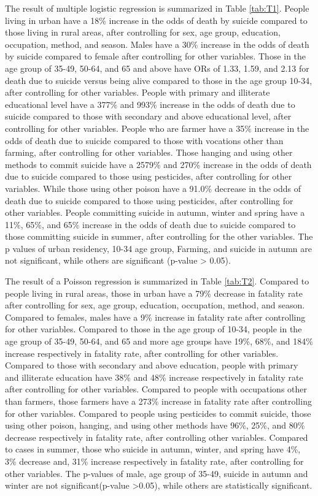 \documentclass[a4paper]{article}
\begin{document}
The result of multiple logistic regression is summarized in Table \ref{tab:T1}. People living in urban have a 18\% increase in the odds of death by suicide compared to those living in rural areas, after controlling for sex, age group, education, occupation, method, and season. Males have a 30\% increase in the odds of death by suicide compared to female after controlling for other variables. Those in the age group of 35-49, 50-64, and 65 and above have ORs of 1.33, 1.59, and 2.13 for death due to suicide versus being alive compared to those in the age group 10-34, after controlling for other variables. People with primary and illiterate educational level have a 377\% and 993\% increase in the odds of death due to suicide compared to those with secondary and above educational level, after controlling for other variables. People who are farmer have a 35\% increase in the odds of death due to suicide compared to those with vocations other than farming, after controlling for other variables. Those hanging and using other methods to commit suicide have a 2579\% and 270\% increase in the odds of death due to suicide compared to those using pesticides, after controlling for other variables. While those using other poison have a 91.0\% decrease in the odds of death due to suicide compared to those using pesticides, after controlling for other variables. People committing suicide in autumn, winter and spring have a 11\%, 65\%, and 65\% increase in the odds of death due to suicide compared to those committing suicide in summer, after controlling for the other variables. The p values of urban residency, 10-34 age group, Farming, and suicide in autumn are not significant, while others are significant (p-value > 0.05).
\newline

\newline
The result of a Poisson regression is summarized in Table \ref{tab:T2}. Compared to people living in rural areas, those in urban have a 79\% decrease in fatality rate after controlling for sex, age group, education, occupation, method, and season. Compared to females, males have a 9\% increase in fatality rate after controlling for other variables. Compared to those in the age group of 10-34, people in the age group of 35-49, 50-64, and 65 and more age groups have 19\%, 68\%, and 184\% increase respectively in fatality rate, after controlling for other variables. Compared to those with secondary and above education, people with primary and illiterate education have 38\% and 48\% increase respectively in fatality rate after controlling for other variables. Compared to people with occupations other than farmers, those farmers have a 273\% increase in fatality rate after controlling for other variables. Compared to people using pesticides to commit suicide, those using other poison, hanging, and using other methods have 96\%, 25\%, and 80\% decrease respectively in fatality rate, after controlling other variables. Compared to cases in summer, those who suicide in autumn, winter, and spring have 4\%,  3\% decrease and, 31\% increase respectively in fatality rate, after controlling for other variables. The p-values of male, age group of 35-49, suicide in autumn and winter are not significant(p-value >0.05), while others are statistically significant.
\end{document}
